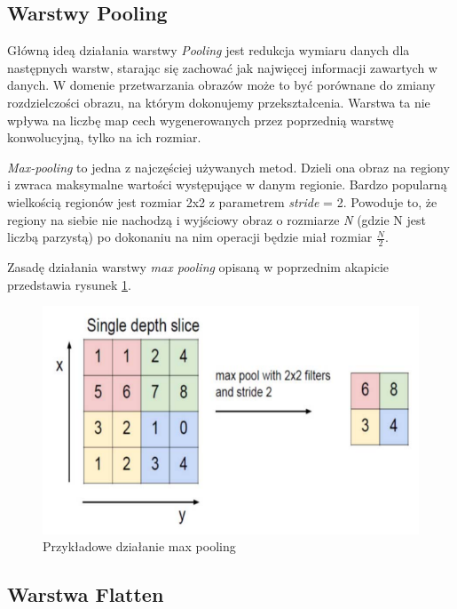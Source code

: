 \documentclass[a4paper,12pt,oneside]{book} %
\begin{document}
\subsection{Warstwy Pooling}
\label{pool}

Główną ideą działania warstwy \emph{Pooling} jest redukcja wymiaru danych dla następnych warstw, starając się zachować jak najwięcej informacji zawartych w danych. W domenie przetwarzania obrazów może to być porównane do zmiany rozdzielczości obrazu, na którym dokonujemy przekształcenia. Warstwa ta nie wpływa na liczbę map cech wygenerowanych przez poprzednią warstwę konwolucyjną, tylko na ich rozmiar\cite{8308186}. 

\emph{Max-pooling} to jedna z najczęściej używanych metod. Dzieli ona obraz na regiony i zwraca maksymalne wartości występujące w danym regionie. Bardzo popularną wielkością regionów jest rozmiar 2x2 z parametrem \emph{stride} = 2. Powoduje to, że regiony na siebie nie nachodzą i wyjściowy obraz o rozmiarze \emph{N} (gdzie N jest liczbą parzystą) po dokonaniu na nim operacji będzie miał rozmiar $\frac{N}{2}$\cite{8308186}.

Zasadę działania warstwy \emph{max pooling} opisaną w poprzednim akapicie przedstawia rysunek \ref{max_pooling}.

\begin{figure}[h]
	\centering
	\includegraphics[scale=0.6]{max_pooling.png}
	\caption{Przykładowe działanie max pooling\cite{8308186}}
	\label{max_pooling}
\end{figure}

\subsection{Warstwa Flatten}
\label{flat}
\end{document}
